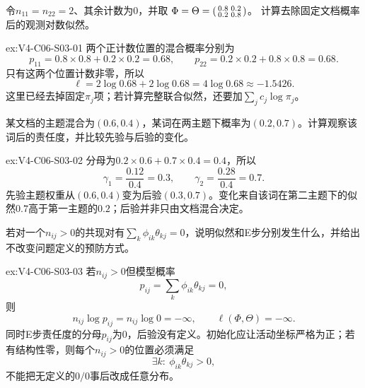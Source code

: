 \begin{SLChapterExercisePairSection}
\begin{exercise}\label{ex:V4-C06-S03-01}
令$n_{11}=n_{22}=2$、其余计数为0，并取
$\Phi=\Theta=\begin{psmallmatrix}0.8&0.2\\0.2&0.8\end{psmallmatrix}$。
计算去除固定文档概率后的观测对数似然。
\end{exercise}
\ifSLFullEdition
{}\label{sol:V4-C06-S03-01}
\begin{chapterexercisesolution}{ex:V4-C06-S03-01}
两个正计数位置的混合概率分别为
\[
p_{11}=0.8\times0.8+0.2\times0.2=0.68,
\qquad
p_{22}=0.2\times0.2+0.8\times0.8=0.68.
\]
只有这两个位置计数非零，所以
\[
\ell=2\log0.68+2\log0.68=4\log0.68\approx-1.5426.
\]
这里已经去掉固定$\pi_j$项；若计算完整联合似然，还要加$\sum_jc_j\log\pi_j$。
\end{chapterexercisesolution}
\fi

\begin{exercise}\label{ex:V4-C06-S03-02}
某文档的主题混合为$(0.6,0.4)$，某词在两主题下概率为$(0.2,0.7)$。计算观察该词后的责任度，并比较先验与后验的变化。
\end{exercise}
\ifSLFullEdition
{}\label{sol:V4-C06-S03-02}
\begin{chapterexercisesolution}{ex:V4-C06-S03-02}
分母为$0.2\times0.6+0.7\times0.4=0.4$，所以
\[
\gamma_1=\frac{0.12}{0.4}=0.3,
\qquad
\gamma_2=\frac{0.28}{0.4}=0.7.
\]
先验主题权重从$(0.6,0.4)$变为后验$(0.3,0.7)$。变化来自该词在第二主题下的似然$0.7$高于第一主题的$0.2$；后验并非只由文档混合决定。
\end{chapterexercisesolution}
\fi

\begin{exercise}\label{ex:V4-C06-S03-03}
若对一个$n_{ij}>0$的共现对有$\sum_k\phi_{ik}\theta_{kj}=0$，说明似然和E步分别发生什么，并给出不改变问题定义的预防方式。
\end{exercise}
\ifSLFullEdition
{}\label{sol:V4-C06-S03-03}
\begin{chapterexercisesolution}{ex:V4-C06-S03-03}
若$n_{ij}>0$但模型概率
\[
p_{ij}=\sum_k\phi_{ik}\theta_{kj}=0,
\]
则
\[
n_{ij}\log p_{ij}=n_{ij}\log0=-\infty,
\qquad
\ell(\Phi,\Theta)=-\infty.
\]
同时E步责任度的分母$p_{ij}$为0，后验没有定义。初始化应让活动坐标严格为正；若有结构性零，则每个$n_{ij}>0$的位置必须满足
\[
\exists k:\ \phi_{ik}\theta_{kj}>0,
\]
不能把无定义的$0/0$事后改成任意分布。
\end{chapterexercisesolution}
\fi


\end{SLChapterExercisePairSection}
